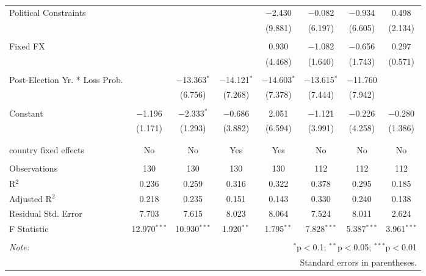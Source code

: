 \begin{tabular}{@{\extracolsep{5pt}}lccccccc}
 Political Constraints &  &  &  & $-$2.430 & $-$0.082 & $-$0.934 & 0.498 \\ 
  &  &  &  & (9.881) & (6.197) & (6.605) & (2.134) \\ 
  & & & & & & & \\ 
 Fixed FX &  &  &  & 0.930 & $-$1.082 & $-$0.656 & 0.297 \\ 
  &  &  &  & (4.468) & (1.640) & (1.743) & (0.571) \\ 
  & & & & & & & \\ 
 Post-Election Yr. * Loss Prob. &  & $-$13.363$^{*}$ & $-$14.121$^{*}$ & $-$14.603$^{*}$ & $-$13.615$^{*}$ & $-$11.760 &  \\ 
  &  & (6.756) & (7.268) & (7.378) & (7.444) & (7.942) &  \\ 
  & & & & & & & \\ 
 Constant & $-$1.196 & $-$2.333$^{*}$ & $-$0.686 & 2.051 & $-$1.121 & $-$0.226 & $-$0.280 \\ 
  & (1.171) & (1.293) & (3.882) & (6.594) & (3.991) & (4.258) & (1.386) \\ 
  & & & & & & & \\ 
\hline \\[-1.8ex] 
country fixed effects & No & No & Yes & Yes & No & No & No \\ 
\hline \\[-1.8ex] 
Observations & 130 & 130 & 130 & 130 & 112 & 112 & 112 \\ 
R$^{2}$ & 0.236 & 0.259 & 0.316 & 0.322 & 0.378 & 0.295 & 0.185 \\ 
Adjusted R$^{2}$ & 0.218 & 0.235 & 0.151 & 0.143 & 0.330 & 0.240 & 0.138 \\ 
Residual Std. Error & 7.703 & 7.615 & 8.023 & 8.064 & 7.524 & 8.011 & 2.624 \\ 
F Statistic & 12.970$^{***}$ & 10.930$^{***}$ & 1.920$^{**}$ & 1.795$^{**}$ & 7.828$^{***}$ & 5.387$^{***}$ & 3.961$^{***}$ \\ 
\hline 
\hline \\[-1.8ex] 
\textit{Note:}  & \multicolumn{7}{r}{$^{*}$p$<$0.1; $^{**}$p$<$0.05; $^{***}$p$<$0.01} \\ 
 & \multicolumn{7}{r}{Standard errors in parentheses.} \\ 
\end{tabular} 
\endgroup 
